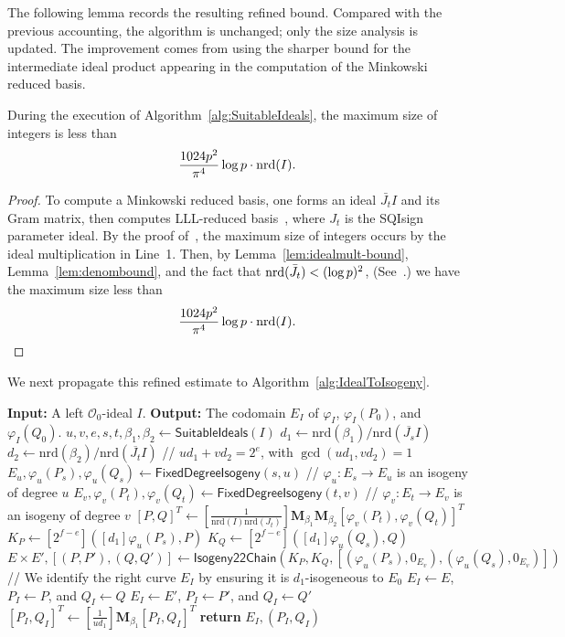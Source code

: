 The following lemma records the resulting refined bound.  Compared with the
previous accounting, the algorithm is unchanged; only the size analysis is
updated.  The improvement comes from using the sharper bound for the intermediate
ideal product appearing in the computation of the Minkowski reduced basis.

\begin{lemma}
During the execution of Algorithm~\ref{alg:SuitableIdeals}, the maximum size of integers is less than \[\frac{1024p^2}{\pi^4}\log{p} \cdot \mathrm{nrd}(I).\]
\end{lemma}

\begin{proof}
To compute a Minkowski reduced basis, one forms an ideal $\bar{J_t}I$ and its Gram matrix, then computes LLL-reduced basis~\cite{AAA+25}, where $J_t$ is the SQIsign parameter ideal.
By the proof of~\cite[Lemma~6]{KLKL25}, the maximum size of integers occurs by the ideal multiplication in Line~1.
Then, by Lemma~\ref{lem:idealmult-bound}, Lemma~\ref{lem:denombound}, and the fact that $\mathrm{nrd}(\bar{J_t}) < (\log{p})^2$, (See~\cite[Appendix~E]{KLKL25}.) we have the maximum size less than
\[
    \frac{1024p^2}{\pi^4}\log{p} \cdot \mathrm{nrd}(I).
\]
\end{proof}
We next propagate this refined estimate to
Algorithm~\ref{alg:IdealToIsogeny}.

\begin{algorithm}
\caption{IdealToIsogeny($I$)}\label{alg:IdealToIsogeny}
\begin{algorithmic}[1]
\Statex \textbf{Input:} A left $\mathcal{O}_0$-ideal $I$.
\Statex \textbf{Output:} The codomain $E_I$ of $\varphi_I$, $\varphi_I(P_0)$, and $\varphi_I(Q_0)$.
\State $u,v,e,s,t,\beta_1,\beta_2 \gets {\textsf{SuitableIdeals}}(I)$
\State $d_1 \gets \mathrm{nrd}(\beta_1)/\mathrm{nrd}(\overline{J_s}I)$
\State $d_2 \gets \mathrm{nrd}(\beta_2)/\mathrm{nrd}(\overline{J_t}I)$ \hfill {// $ud_1 + vd_2 = 2^e$, with $\gcd(ud_1,vd_2)=1$}
\State $E_u,\varphi_u(P_s), \varphi_u(Q_s) \gets {\textsf{FixedDegreeIsogeny}}(s,u)$ \hfill {// $\varphi_u: E_s \to E_u$ is an isogeny of degree $u$}
\State $E_v,\varphi_v(P_t), \varphi_v(Q_t) \gets {\textsf{FixedDegreeIsogeny}}(t,v)$ \hfill {// $\varphi_v: E_t \to E_v$ is an isogeny of degree $v$}
\State $[P,Q]^T \gets \left[\frac{1}{\mathrm{nrd}(I)\mathrm{nrd}(J_t)}\right] \mathbf{M}_{\beta_1} \mathbf{M}_{\beta_2} [\varphi_v(P_t), \varphi_v(Q_t)]^T$
\State $K_P \gets [2^{f-e}]([d_1]\varphi_u(P_s), P)$
\State $K_Q \gets [2^{f-e}]([d_1]\varphi_u(Q_s), Q)$
\State $E \times E', [(P,P'),(Q,Q')] \gets {\textsf{Isogeny22Chain}}(K_P, K_Q, [(\varphi_u(P_s), 0_{E_v}), (\varphi_u(Q_s), 0_{E_v})])$
 \hfill {// We identify the right curve $E_I$ by ensuring it is $d_1$-isogeneous to $E_0$}
    \State $E_I \gets E$, $P_I \gets P$, and $Q_I \gets Q$
\Else
    \State $E_I \gets E'$, $P_I \gets P'$, and $Q_I \gets Q'$
    \State $[P_I,Q_I]^T \gets \left[\frac{1}{ud_1}\right]\mathbf{M}_{\beta_1}[P_I,Q_I]^T$
\EndIf
\State \textbf{return} $E_I, (P_I, Q_I)$
\end{algorithmic}
\end{algorithm}

